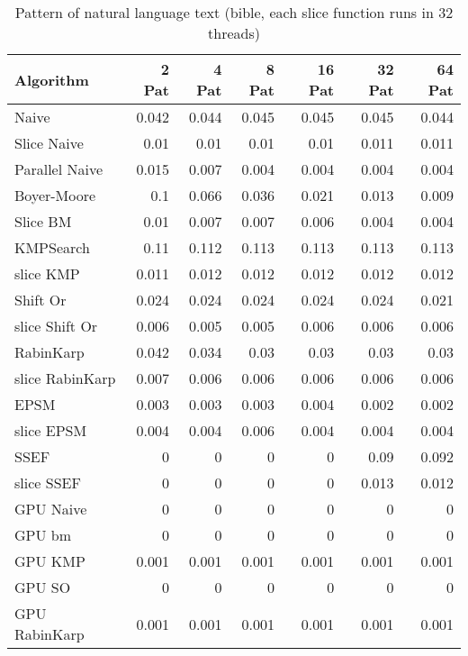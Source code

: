 \documentclass[11pt]{article}       %
\newcommand{\includeFig}[3]      {\begin{figure}[htb] \begin{center}
                                 \includegraphics
                                 [width=4in,keepaspectratio] %
                                 {#2}\caption{\label{#1}#3} \end{center} \end{figure}}
\begin{document}


\begin{table}[htbp]
  \centering
  \caption{Pattern of natural language text (bible, each slice function runs in 32 threads)}
    \begin{tabular}{lrrrrrr}\label{t1}
Algorithm & 2 Pat & 4 Pat & 8 Pat & 16 Pat & 32 Pat & 64 Pat \\
 \hline
    Naive & 0.042 & 0.044 & 0.045 & 0.045 & 0.045 & 0.044 \\
    Slice Naive & 0.01  & 0.01  & 0.01  & 0.01  & 0.011 & 0.011 \\
    Parallel Naive & 0.015 & 0.007 & 0.004 & 0.004 & 0.004 & 0.004 \\
    Boyer-Moore & 0.1   & 0.066 & 0.036 & 0.021 & 0.013 & 0.009 \\
    Slice BM & 0.01  & 0.007 & 0.007 & 0.006 & 0.004 & 0.004 \\
    KMPSearch & 0.11  & 0.112 & 0.113 & 0.113 & 0.113 & 0.113 \\
    slice KMP & 0.011 & 0.012 & 0.012 & 0.012 & 0.012 & 0.012 \\
    Shift Or & 0.024 & 0.024 & 0.024 & 0.024 & 0.024 & 0.021 \\
    slice Shift Or & 0.006 & 0.005 & 0.005 & 0.006 & 0.006 & 0.006 \\
    RabinKarp & 0.042 & 0.034 & 0.03  & 0.03  & 0.03  & 0.03 \\
    slice RabinKarp & 0.007 & 0.006 & 0.006 & 0.006 & 0.006 & 0.006 \\
    EPSM  & 0.003 & 0.003 & 0.003 & 0.004 & 0.002 & 0.002 \\
    slice EPSM & 0.004 & 0.004 & 0.006 & 0.004 & 0.004 & 0.004 \\
    SSEF  & 0     & 0     & 0     & 0     & 0.09  & 0.092 \\
    slice SSEF & 0 & 0 & 0 & 0 & 0.013 & 0.012 \\
    GPU Naive & 0     & 0     & 0     & 0     & 0     & 0 \\
    GPU bm & 0     & 0     & 0     & 0     & 0     & 0 \\
    GPU KMP & 0.001 & 0.001 & 0.001 & 0.001 & 0.001 & 0.001 \\
    GPU SO & 0     & 0     & 0     & 0     & 0     & 0 \\
    GPU RabinKarp & 0.001 & 0.001 & 0.001 & 0.001 & 0.001 & 0.001 \\
    \end{tabular}%
  \label{tab:addlabel}%
\end{table}%
\end{document}
